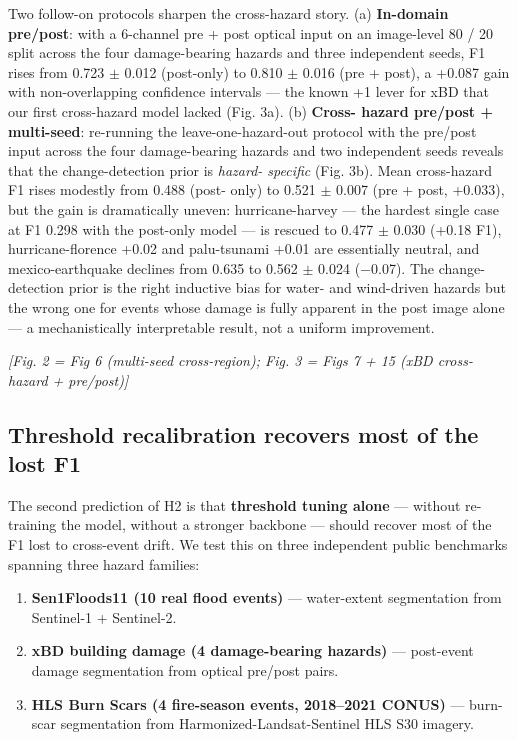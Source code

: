 Two follow-on protocols sharpen the cross-hazard story. (a) \textbf{In-domain
pre/post}: with a 6-channel pre + post optical input on an image-level
80 / 20 split across the four damage-bearing hazards and three independent
seeds, F1 rises from 0.723 $\pm$ 0.012 (post-only) to 0.810 $\pm$ 0.016 (pre + post),
a +0.087 gain with non-overlapping confidence intervals --- the known +1 lever
for xBD that our first cross-hazard model lacked (Fig. 3a). (b) \textbf{Cross-
hazard pre/post + multi-seed}: re-running the leave-one-hazard-out protocol
with the pre/post input across the four damage-bearing hazards and two
independent seeds reveals that the change-detection prior is \emph{hazard-
specific} (Fig. 3b). Mean cross-hazard F1 rises modestly from 0.488 (post-
only) to 0.521 $\pm$ 0.007 (pre + post, +0.033), but the gain is dramatically
uneven: hurricane-harvey --- the hardest single case at F1 0.298 with the
post-only model --- is rescued to 0.477 $\pm$ 0.030 (+0.18 F1), hurricane-florence
+0.02 and palu-tsunami +0.01 are essentially neutral, and mexico-earthquake
declines from 0.635 to 0.562 $\pm$ 0.024 ($-$0.07). The change-detection prior is
the right inductive bias for water- and wind-driven hazards but the wrong one
for events whose damage is fully apparent in the post image alone --- a
mechanistically interpretable result, not a uniform improvement.

\emph{{[}Fig. 2 = Fig 6 (multi-seed cross-region); Fig. 3 = Figs 7 + 15 (xBD cross-
hazard + pre/post){]}}

\subsection{Threshold recalibration recovers most of the lost F1}\label{threshold-recalibration-recovers-most-of-the-lost-f1}

The second prediction of H2 is that \textbf{threshold tuning alone} --- without
re-training the model, without a stronger backbone --- should recover most
of the F1 lost to cross-event drift. We test this on three independent
public benchmarks spanning three hazard families:

\begin{enumerate}
\def\labelenumi{\arabic{enumi}.}
\tightlist
\item
  \textbf{Sen1Floods11 (10 real flood events)} --- water-extent segmentation
  from Sentinel-1 + Sentinel-2.
\item
  \textbf{xBD building damage (4 damage-bearing hazards)} --- post-event
  damage segmentation from optical pre/post pairs.
\item
  \textbf{HLS Burn Scars (4 fire-season events, 2018--2021 CONUS)} --- burn-
  scar segmentation from Harmonized-Landsat-Sentinel HLS S30 imagery.
\end{enumerate}

